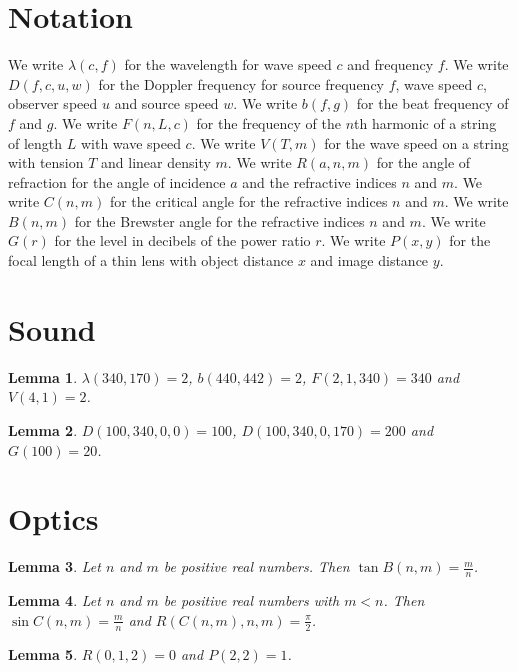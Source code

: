 \documentclass{article}
\newtheorem{lemma}{Lemma}
\begin{document}
\section{Notation}

We write $\lambda(c,f)$ for the wavelength for wave speed $c$ and frequency $f$.
We write $D(f,c,u,w)$ for the Doppler frequency for source frequency $f$, wave speed $c$, observer speed $u$ and source speed $w$.
We write $b(f,g)$ for the beat frequency of $f$ and $g$.
We write $F(n,L,c)$ for the frequency of the $n$th harmonic of a string of length $L$ with wave speed $c$.
We write $V(T,m)$ for the wave speed on a string with tension $T$ and linear density $m$.
We write $R(a,n,m)$ for the angle of refraction for the angle of incidence $a$ and the refractive indices $n$ and $m$.
We write $C(n,m)$ for the critical angle for the refractive indices $n$ and $m$.
We write $B(n,m)$ for the Brewster angle for the refractive indices $n$ and $m$.
We write $G(r)$ for the level in decibels of the power ratio $r$.
We write $P(x,y)$ for the focal length of a thin lens with object distance $x$ and image distance $y$.

\section{Sound}

\begin{lemma}\label{sound}
$\lambda(340,170)=2$, $b(440,442)=2$, $F(2,1,340)=340$ and $V(4,1)=2$.
\end{lemma}

\begin{lemma}\label{doppler}
$D(100,340,0,0)=100$, $D(100,340,0,170)=200$ and $G(100)=20$.
\end{lemma}

\section{Optics}

\begin{lemma}\label{brewster}
Let $n$ and $m$ be positive real numbers. Then $\tan B(n,m)=\frac{m}{n}$.
\end{lemma}

\begin{lemma}\label{critical}
Let $n$ and $m$ be positive real numbers with $m<n$. Then $\sin C(n,m)=\frac{m}{n}$ and $R(C(n,m),n,m)=\frac{\pi}{2}$.
\end{lemma}

\begin{lemma}\label{lens}
$R(0,1,2)=0$ and $P(2,2)=1$.
\end{lemma}
\end{document}

